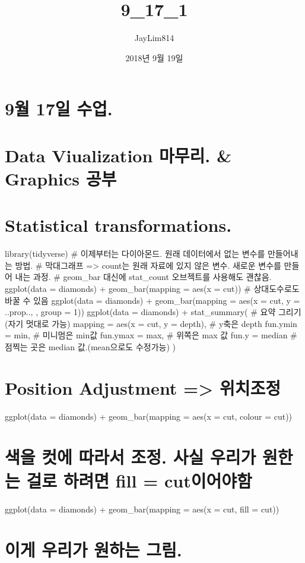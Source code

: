 \documentclass[]{article}
\title{9\_17\_1}
\author{JayLim814}
\date{2018년 9월 19일}
\begin{document}
\maketitle

\section{9월 17일 수업.}\label{-17-.}

\section{Data Viualization 마무리. \& Graphics
공부}\label{data-viualization-.-graphics-}

\section{Statistical
transformations.}\label{statistical-transformations.}

library(tidyverse) \# 이제부터는 다이아몬드. 원래 데이터에서 없는 변수를
만들어내는 방법. \# 막대그래프 =\textgreater{} count는 원래 자료에 있지
않은 변수. 새로운 변수를 만들어 내는 과정. \# geom\_bar 대신에
stat\_count 오브젝트를 사용해도 괜찮음. ggplot(data = diamonds) +
geom\_bar(mapping = aes(x = cut)) \# 상대도수로도 바꿀 수 있음
ggplot(data = diamonds) + geom\_bar(mapping = aes(x = cut, y = ..prop..,
, group = 1)) ggplot(data = diamonds) + stat\_summary( \# 요약
그리기(자기 멋대로 가능) mapping = aes(x = cut, y = depth), \# y축은
depth fun.ymin = min, \# 미니멈은 min값 fun.ymax = max, \# 위쪽은 max 값
fun.y = median \# 점찍는 곳은 median 값.(mean으로도 수정가능) )

\section{Position Adjustment =\textgreater{}
위치조정}\label{position-adjustment-}

ggplot(data = diamonds) + geom\_bar(mapping = aes(x = cut, colour =
cut))

\section{색을 컷에 따라서 조정. 사실 우리가 원한는 걸로 하려면 fill =
cut이어야함}\label{---.------fill-cut}

ggplot(data = diamonds) + geom\_bar(mapping = aes(x = cut, fill = cut))

\section{이게 우리가 원하는 그림.}\label{---.}
\end{document}
